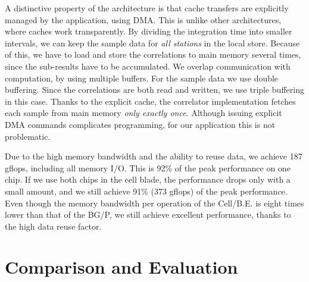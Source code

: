 \documentclass{article}
\begin{document}
A distinctive property of the architecture is that cache transfers are
explicitly managed by the application, using DMA. This is unlike other 
architectures, where caches work transparently.
By dividing the
integration time into smaller intervals, we can keep the sample data
for \emph{all stations} in the local store.  
Because of this, we have to load and store the correlations to main
memory several times, since the sub-results have to
be accumulated.  
We overlap communication with computation, by using multiple buffers.
For the sample data we use double buffering.
Since the correlations are both read and written, we use triple buffering in this case.
Thanks to the explicit cache,
the correlator implementation fetches each sample from main memory
\emph{only exactly once}. 
Although issuing explicit DMA commands complicates programming,
for our application this is not problematic.

Due to the high
memory bandwidth and the ability to reuse data, we achieve 187
gflops, including all memory I/O. This is 92\% of the peak
performance on one chip.  If we use both chips in the cell blade, the
performance drops only with a small amount, and we still achieve
91\% (373 gflops) of the peak performance.  Even though the memory
bandwidth per operation of the \mbox{Cell/B.E.} is eight times lower than
that of the BG/P, we still achieve excellent performance, thanks to
the high data reuse factor.


\section{Comparison and Evaluation}
\label{sec:perf-compare}
\end{document}
